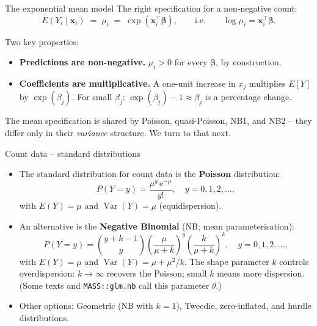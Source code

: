 \documentclass[10pt,ignorenonframetext,aspectratio=169]{beamer}
\begin{document}
\begin{frame}{The exponential mean model}
The right specification for a non-negative count:
\[
E(Y_i \mid \mathbf{x}_i) \;=\; \mu_i \;=\; \exp(\mathbf{x}_i^\top \boldsymbol{\beta}),
\qquad \text{i.e.} \qquad
\log \mu_i = \mathbf{x}_i^\top \boldsymbol{\beta}.
\]

\medskip
Two key properties:

\begin{itemize}
    \justifying
    \item \textbf{Predictions are non-negative.} $\mu_i > 0$ for every $\boldsymbol{\beta}$, by construction.
    \item \textbf{Coefficients are multiplicative.} A one-unit increase in $x_j$ multiplies $E[Y]$ by $\exp(\beta_j)$. For small $\beta_j$: $\exp(\beta_j) - 1 \approx \beta_j$ is a percentage change.
\end{itemize}

\medskip
The mean specification is shared by Poisson, quasi-Poisson, NB1, and NB2 -- they differ only in their \emph{variance} structure. We turn to that next.
\end{frame}


\begin{frame}{Count data -- standard distributions}
    \begin{itemize}
    \justifying
        \item The standard distribution for count data is the \textbf{Poisson} distribution:
        \[
        P(Y = y) = \frac{\mu^{y}\, \mathrm{e}^{-\mu}}{y!}, \quad y = 0, 1, 2, \ldots,
        \]
        with $E(Y) = \mu$ and $\operatorname{Var}(Y) = \mu$ (equidispersion).
        \item An alternative is the \textbf{Negative Binomial} (NB; mean parameterisation):
        \[
        P(Y = y) = \binom{y + k - 1}{y}\left(\frac{\mu}{\mu + k}\right)^{y}\left(\frac{k}{\mu + k}\right)^{k}, \quad y = 0, 1, 2, \ldots,
        \]
        with $E(Y) = \mu$ and $\operatorname{Var}(Y) = \mu + \mu^2/k$. The shape parameter $k$ controls overdispersion: $k \to \infty$ recovers the Poisson; small $k$ means more dispersion. (Some texts and \texttt{MASS::glm.nb} call this parameter $\theta$.)
        \item Other options: Geometric (NB with $k = 1$), Tweedie, zero-inflated, and hurdle distributions.
    \end{itemize}
\end{frame}
\end{document}

